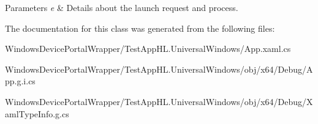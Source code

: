 \begin{DoxyParams}{Parameters}
{\em e} & Details about the launch request and process.\\
\hline
\end{DoxyParams}


The documentation for this class was generated from the following files\+:\begin{DoxyCompactItemize}
\item 
Windows\+Device\+Portal\+Wrapper/\+Test\+App\+H\+L.\+Universal\+Windows/App.\+xaml.\+cs\item 
Windows\+Device\+Portal\+Wrapper/\+Test\+App\+H\+L.\+Universal\+Windows/obj/x64/\+Debug/App.\+g.\+i.\+cs\item 
Windows\+Device\+Portal\+Wrapper/\+Test\+App\+H\+L.\+Universal\+Windows/obj/x64/\+Debug/Xaml\+Type\+Info.\+g.\+cs\end{DoxyCompactItemize}
